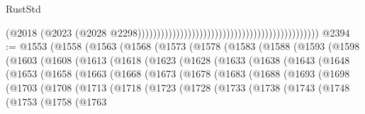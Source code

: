 \begin{lexlean}{RustStd}
\begin{coremodule}
{\begin{coremodule}
{{{{{{{{{{{{{{{{{{{{{{{{{{{{{{{{{{{{{{{{{{{{{{{{{{{{{{{{{{{{                                                                                            (@2018
                                                                                              (@2023
                                                                                                (@2028
                                                                                                  @2298)))))))))))))))))))))))))))))))))))))))))))))))
@2394 := @1553
    (@1558
      (@1563
        (@1568
          (@1573
            (@1578
              (@1583
                (@1588
                  (@1593
                    (@1598
                      (@1603
                        (@1608
                          (@1613
                            (@1618
                              (@1623
                                (@1628
                                  (@1633
                                    (@1638
                                      (@1643
                                        (@1648
                                          (@1653
                                            (@1658
                                              (@1663
                                                (@1668
                                                  (@1673
                                                    (@1678
                                                      (@1683
                                                        (@1688
                                                          (@1693
                                                            (@1698
                                                              (@1703
                                                                (@1708
                                                                  (@1713
                                                                    (@1718
                                                                      (@1723
                                                                        (@1728
                                                                          (@1733
                                                                            (@1738
                                                                              (@1743
                                                                                (@1748
                                                                                  (@1753
                                                                                    (@1758
                                                                                      (@1763
}}}}}}}}}}}}}}}}}}}}}}}}}}}}}}}}}}}}}}}}}}}}}}}}}}}}}}}}}}}}
\end{coremodule}}
\end{coremodule}
\end{lexlean}
